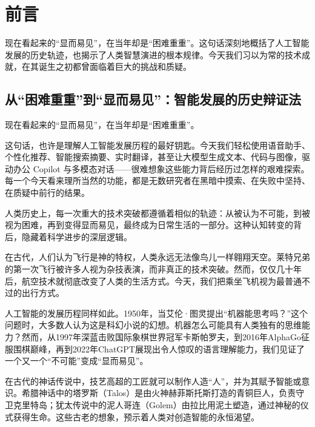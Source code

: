 \chapter*{ 前言}


\begin{introduction}

\item 现在看起来的“显而易见”，在当年却是“困难重重”。这句话深刻地概括了人工智能发展的历史轨迹，也揭示了人类智慧演进的根本规律。今天我们习以为常的技术成就，在其诞生之初都曾面临着巨大的挑战和质疑。

\end{introduction}

\section{从“困难重重”到“显而易见”：智能发展的历史辩证法}

现在看起来的“显而易见”，在当年却是“困难重重”。

这句话，也许是理解人工智能发展历程的最好钥匙。今天我们轻松使用语音助手、个性化推荐、智能搜索摘要、实时翻译，甚至让大模型生成文本、代码与图像，驱动办公 Copilot 与多模态对话——很难想象这些能力背后经历过怎样的艰难探索。每一个今天看来理所当然的功能，都是无数研究者在黑暗中摸索、在失败中坚持、在质疑中前行的结果。

人类历史上，每一次重大的技术突破都遵循着相似的轨迹：从被认为不可能，到被视为困难，再到变得显而易见，最终成为日常生活的一部分。这种认知转变的背后，隐藏着科学进步的深层逻辑。

在古代，人们认为飞行是神的特权，人类永远无法像鸟儿一样翱翔天空。莱特兄弟的第一次飞行被许多人视为杂技表演，而非真正的技术突破。然而，仅仅几十年后，航空技术就彻底改变了人类的生活方式。今天，我们把乘坐飞机视为最普通不过的出行方式。

人工智能的发展历程同样如此。1950年，当艾伦·图灵提出“机器能思考吗？”这个问题时，大多数人认为这是科幻小说的幻想。机器怎么可能具有人类独有的思维能力？然而，从1997年深蓝击败国际象棋世界冠军卡斯帕罗夫，到2016年AlphaGo征服围棋巅峰，再到2022年ChatGPT展现出令人惊叹的语言理解能力，我们见证了一个又一个“不可能”变成“显而易见”。

在古代的神话传说中，技艺高超的工匠就可以制作人造“人”，并为其赋予智能或意识。希腊神话中的塔罗斯（Talos）是由火神赫菲斯托斯打造的青铜巨人，负责守卫克里特岛；犹太传说中的泥人哥连（Golem）由拉比用泥土塑造，通过神秘的仪式获得生命。这些古老的想象，预示着人类对创造智能的永恒渴望。

